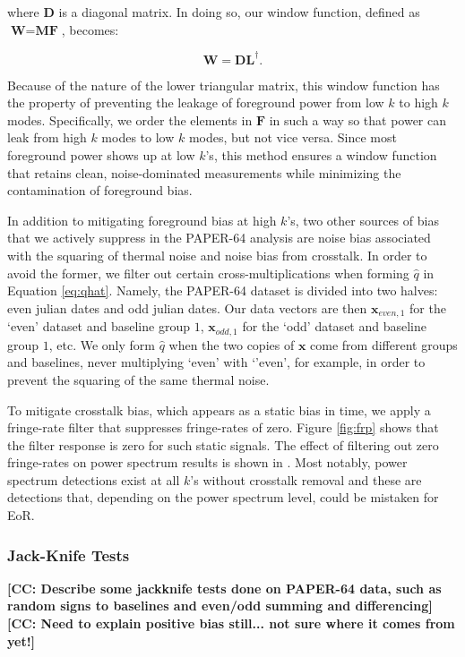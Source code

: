 \documentclass[preprint2,numberedappendix,tighten]{aastex6}  %
\newcommand{\cc}[1]{{\color{purple} \textbf{[CC: #1]}}}
\begin{document}
\noindent where $\textbf{D}$ is a diagonal matrix. In doing so, our window function, defined as $\textbf{W} = \textbf{MF}$, becomes:

\begin{equation}
\textbf{W} = \textbf{DL}^{\dagger}.
\end{equation}

\noindent Because of the nature of the lower triangular matrix, this window function has the property of preventing the leakage of foreground power from low $k$ to high $k$ modes. Specifically, we order the elements in $\textbf{F}$ in such a way so that power can leak from high $k$ modes to low $k$ modes, but not vice versa. Since most foreground power shows up at low $k$'s, this method ensures a window function that retains clean, noise-dominated measurements while minimizing the contamination of foreground bias.

In addition to mitigating foreground bias at high $k$'s, two other sources of bias that we actively suppress in the PAPER-64 analysis are noise bias associated with the squaring of thermal noise and noise bias from crosstalk. In order to avoid the former, we filter out certain cross-multiplications when forming $\hat{q}$ in Equation \ref{eq:qhat}. Namely, the PAPER-64 dataset is divided into two halves: even julian dates and odd julian dates. Our data vectors are then $\textbf{x}_{even, 1}$ for the `even' dataset and baseline group $1$, $\textbf{x}_{odd, 1}$ for the `odd' dataset and baseline group $1$, etc. We only form $\hat{q}$ when the two copies of $\textbf{x}$ come from different groups and baselines, never multiplying `even' with `'even', for example, in order to prevent the squaring of the same thermal noise.

To mitigate crosstalk bias, which appears as a static bias in time, we apply a fringe-rate filter that suppresses fringe-rates of zero. Figure \ref{fig:frp} shows that the filter response is zero for such static signals. The effect of filtering out zero fringe-rates on power spectrum results is shown in \citet{ali_et_al2015}. Most notably, power spectrum detections exist at all $k$'s without crosstalk removal and these are detections that, depending on the power spectrum level, could be mistaken for EoR. 

\subsubsection{Jack-Knife Tests}

\cc{Describe some jackknife tests done on PAPER-64 data, such as random signs to baselines and even/odd summing and differencing} \\
\cc{Need to explain positive bias still... not sure where it comes from yet!}
\end{document}
